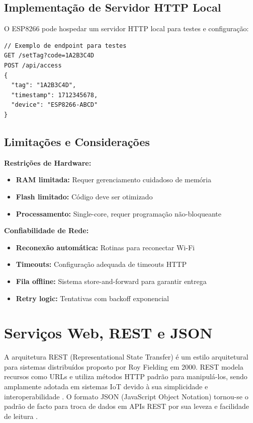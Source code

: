 \subsection{Implementação de Servidor HTTP Local}

O ESP8266 pode hospedar um servidor HTTP local para testes e configuração:

\begin{verbatim}
// Exemplo de endpoint para testes
GET /setTag?code=1A2B3C4D
POST /api/access
{
  "tag": "1A2B3C4D",
  "timestamp": 1712345678,
  "device": "ESP8266-ABCD"
}
\end{verbatim}

\subsection{Limitações e Considerações}

\textbf{Restrições de Hardware:}
\begin{itemize}
\item \textbf{RAM limitada:} Requer gerenciamento cuidadoso de memória
\item \textbf{Flash limitado:} Código deve ser otimizado
\item \textbf{Processamento:} Single-core, requer programação não-bloqueante
\end{itemize}

\textbf{Confiabilidade de Rede:}
\begin{itemize}
\item \textbf{Reconexão automática:} Rotinas para reconectar Wi-Fi
\item \textbf{Timeouts:} Configuração adequada de timeouts HTTP
\item \textbf{Fila offline:} Sistema store-and-forward para garantir entrega
\item \textbf{Retry logic:} Tentativas com backoff exponencial
\end{itemize}

\section{Serviços Web, REST e JSON}
\label{sec:rest-json}

A arquitetura REST (Representational State Transfer) é um estilo arquitetural para sistemas distribuídos proposto por Roy Fielding em 2000. REST modela recursos como URLs e utiliza métodos HTTP padrão para manipulá-los, sendo amplamente adotada em sistemas IoT devido à sua simplicidade e interoperabilidade \cite{restful-api-tutorial}. O formato JSON (JavaScript Object Notation) tornou-se o padrão de facto para troca de dados em APIs REST por sua leveza e facilidade de leitura \cite{mdn-json}.

